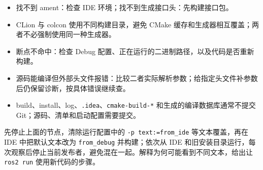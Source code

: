 \begin{conclusion}
\begin{itemize}
\item 找不到 ament：检查 IDE 环境；找不到生成接口头：先构建接口包。
\item CLion 与 colcon 使用不同构建目录，避免 CMake 缓存和生成器相互覆盖；两者不必强制使用同一种生成器。
\item 断点不命中：检查 Debug 配置、正在运行的二进制路径，以及代码是否重新构建。
\item 源码能编译但外部头文件报错：比较二者实际解析参数；给指定头文件补参数后仍保留诊断，按具体错误继续查。
\item build、install、log、\texttt{.idea}、\texttt{cmake-build-*} 和生成的编译数据库通常不提交 Git；源码、清单和启动配置需要提交。
\end{itemize}
\end{conclusion}
\begin{exercise}
\label{ex:v2-ros-ide}
先停止上面的节点，清除运行配置中的 \texttt{-p text:=from\_ide} 等文本覆盖，再在 IDE 中把默认文本改为 \texttt{from\_debug} 并构建；依次从 IDE 和旧安装目录运行，每次观察后停止当前发布者，避免混在一起。解释为何可能看到不同文本，给出让 \texttt{ros2 run} 使用新代码的步骤。
\end{exercise}
